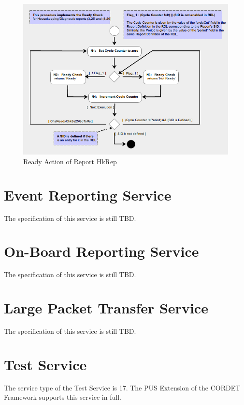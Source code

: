 \documentclass[a4paper,10pt]{article}
\let\stdsection\section
\renewcommand\section{\newpage\stdsection}
\begin{document}
\begin{figure}[H]
 \centering
 \includegraphics[scale=0.55,keepaspectratio=true]{CrPsRep3s25Ready.png}
 \caption{Ready Action of Report HkRep}
 \label{fig:Rep3s25Ready}
\end{figure}

\section{Event Reporting Service}\label{sec:serv5}
The specification of this service is still TBD.

\section{On-Board Reporting Service}\label{sec:serv12}
The specification of this service is still TBD.


\section{Large Packet Transfer Service}\label{sec:serv13}
The specification of this service is still TBD.


\section{Test Service}\label{sec:serv17}
The service type of the Test Service is 17. The PUS Extension of the CORDET Framework supports this service in full.
\end{document}
